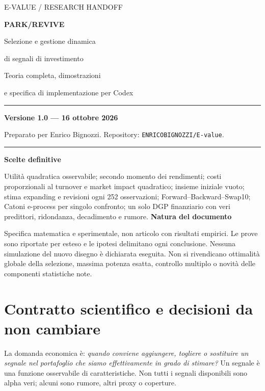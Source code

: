 \documentclass[11pt,a4paper]{article}
\theoremstyle{definition}\newtheorem{definition}[theorem]{Definizione}
\theoremstyle{remark}\newtheorem{remark}[theorem]{Osservazione}
\begin{document}
\begin{titlepage}
\vspace*{12mm}
{\color{ink}\Large E-VALUE / RESEARCH HANDOFF}\par\vspace{13mm}
{\Huge\bfseries PARK/REVIVE}\par\vspace{5mm}
{\LARGE Selezione e gestione dinamica\par di segnali di investimento}\par\vspace{11mm}
{\Large Teoria completa, dimostrazioni\par e specifica di implementazione per Codex}\par\vspace{14mm}
\rule{\linewidth}{0.7pt}
\textbf{Versione 1.0 --- 16 ottobre 2026}\par
Preparato per Enrico Bignozzi. Repository: \texttt{ENRICOBIGNOZZI/E-value}.\par
\rule{\linewidth}{0.7pt}
\vspace{8mm}
\textbf{Scelte definitive}\par
Utilità quadratica osservabile; secondo momento dei rendimenti; costi proporzionali al turnover e market impact quadratico; insieme iniziale vuoto; stima expanding e revisioni ogni 252 osservazioni; Forward--Backward--Swap10; Catoni e-process per singolo confronto; un solo DGP finanziario con veri predittori, ridondanza, decadimento e rumore.
\vfill
\textbf{Natura del documento}\par
Specifica matematica e sperimentale, non articolo con risultati empirici. Le prove sono riportate per esteso e le ipotesi delimitano ogni conclusione. Nessuna simulazione del nuovo disegno è dichiarata eseguita. Non si rivendicano ottimalità globale della selezione, massima potenza esatta, controllo multiplo o novità delle componenti statistiche note.
\end{titlepage}
\begingroup
\small
\setlength{\parskip}{0pt}
\tableofcontents
\endgroup\newpage

\section{Contratto scientifico e decisioni da non cambiare}
\label{sec:contract}
La domanda economica è: \emph{quando conviene aggiungere, togliere o sostituire un segnale nel portafoglio che siamo effettivamente in grado di stimare?} Un segnale è una funzione osservabile di caratteristiche. Non tutti i segnali disponibili sono alpha veri; alcuni sono rumore, altri proxy o coperture.
\end{document}
